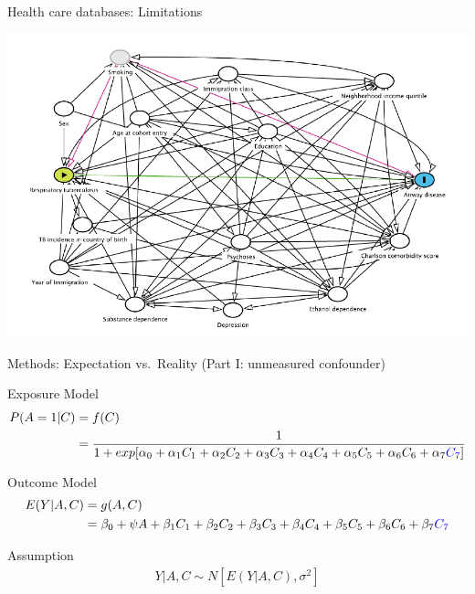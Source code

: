 \documentclass[
  ignorenonframetext,
  aspectratio=169]{beamer}
\begin{document}
\begin{frame}{Health care databases: Limitations}
\protect\hypertarget{health-care-databases-limitations-1}{}
\begin{center}
\includegraphics[width=0.65\linewidth]{dag.png}
\end{center}
\end{frame}

\begin{frame}{Methods: Expectation vs.~Reality (Part I: unmeasured
confounder)}
\protect\hypertarget{methods-expectation-vs.-reality-part-i-unmeasured-confounder}{}
\begin{block}{Exposure Model}
\protect\hypertarget{exposure-model}{}
\begin{equation}
\begin{aligned}
P(A=1|C) &= f(C) \\
        &= \frac{1}{1+exp[\alpha_0 + \alpha_1 C_1 + \alpha_2 C_2 + \alpha_3 C_3 + \alpha_4 C_4 + \alpha_5 C_5 + \alpha_6 C_6 + \alpha_7 \textcolor{blue}{C_7} ]}\nonumber
\end{aligned}
\end{equation}
\end{block}

\begin{block}{Outcome Model}
\protect\hypertarget{outcome-model}{}
\begin{equation}
\begin{aligned}
E(Y|A,C) &= g(A,C)\\
&= \beta_0 + \psi A + \beta_1 C_1 + \beta_2 C_2 + \beta_3 C_3 + \beta_4 C_4 + \beta_5 C_5 + \beta_6 C_6 + \beta_7 \textcolor{blue}{C_7} \nonumber
\end{aligned}
\end{equation}
\end{block}

\begin{block}{Assumption}
\protect\hypertarget{assumption}{}
\begin{equation} \label{eq:out2}
\begin{aligned}
Y | A,C \sim N[E(Y|A,C), \sigma^2] \nonumber
\end{aligned}
\end{equation}
\end{block}
\end{frame}
\end{document}
